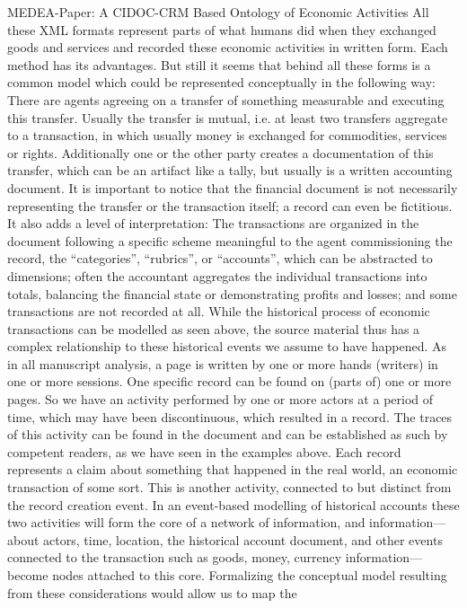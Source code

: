 \documentclass[12pt,a4paper]{article}
\begin{document}
MEDEA-Paper:
A CIDOC-CRM Based Ontology of Economic Activities
All these XML formats represent parts of what humans did when they exchanged goods and
services and recorded these economic activities in written form. Each method has its advantages.
But still it seems that behind all these forms is a common model which could be represented
conceptually in the following way: There are agents agreeing on a transfer of something
measurable and executing this transfer. Usually the transfer is mutual, i.e. at least two transfers
aggregate to a transaction, in which usually money is exchanged for commodities, services or
rights. Additionally one or the other party creates a documentation of this transfer, which can be
an artifact like a tally, but usually is a written accounting document. It is important to notice that
the financial document is not necessarily representing the transfer or the transaction itself; a
record can even be fictitious. It also adds a level of interpretation: The transactions are organized
in the document following a specific scheme meaningful to the agent commissioning the record,
the “categories”, “rubrics”, or “accounts”, which can be abstracted to dimensions; often the
accountant aggregates the individual transactions into totals, balancing the financial state or
demonstrating profits and losses; and some transactions are not recorded at all.
While the historical process of economic transactions can be modelled as seen above, the source
material thus has a complex relationship to these historical events we assume to have happened.
As in all manuscript analysis, a page is written by one or more hands (writers) in one or more
sessions. One specific record can be found on (parts of) one or more pages. So we have an
activity performed by one or more actors at a period of time, which may have been
discontinuous, which resulted in a record. The traces of this activity can be found in the
document and can be established as such by competent readers, as we have seen in the examples
above.
Each record represents a claim about something that happened in the real world, an economic
transaction of some sort. This is another activity, connected to but distinct from the record
creation event. In an event-based modelling of historical accounts these two activities will form
the core of a network of information, and information—about actors, time, location, the historical account document, and other events connected to the transaction such as goods,
money, currency information—become nodes attached to this core.
Formalizing the conceptual model resulting from these considerations would allow us to map the
\end{document}
